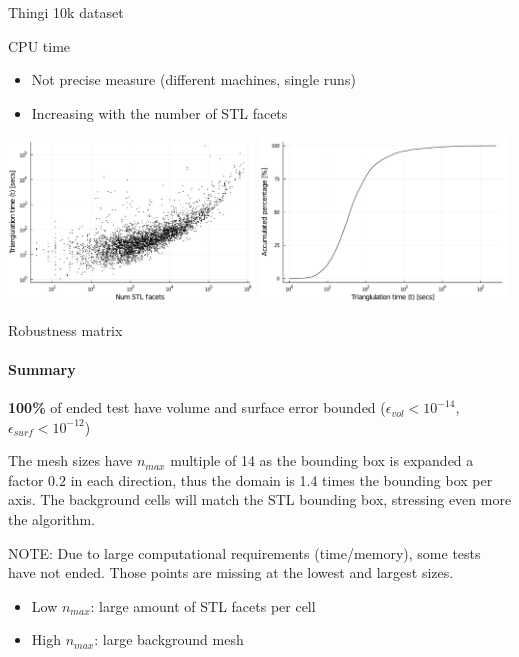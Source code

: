 \documentclass{beamer}
\begin{document}
\begin{frame}{Thingi 10k dataset}

  \begin{block}{CPU time}
  \begin{itemize}
    \item
      Not precise measure (different machines, single runs)
    \item
      Increasing with the number of STL facets
  \end{itemize}
  \end{block}

  \includegraphics[width=0.49\textwidth]{../analysis/plots/num_stl_facets_time}
  \includegraphics[width=0.49\textwidth]{../analysis/plots/histogram_time}
\end{frame}


\begin{frame}{Robustness matrix}
  \framesubtitle{Summary}

  \textbf{100\%} of ended test have volume and surface error bounded 
  ($\epsilon_{vol} < 10^{-14}$,$\epsilon_{surf} < 10^{-12}$) 

  \begin{block}

  The mesh sizes have $n_{max}$ multiple of 14 as the bounding box is expanded 
  a factor $0.2$ in each direction, thus the domain is 1.4 times the 
  bounding box per axis. The background cells will match the STL bounding box, 
  stressing even more the algorithm.
  \end{block}

  \vfill{}
  NOTE: Due to large computational requirements (time/memory),
  some tests have not ended.
  Those points are missing at the lowest and largest sizes.
  \begin{itemize}
    \item
      Low $n_{max}$: large amount of STL facets per cell
    \item
      High $n_{max}$: large background mesh

  \end{itemize}
 

\end{frame}
\end{document}
